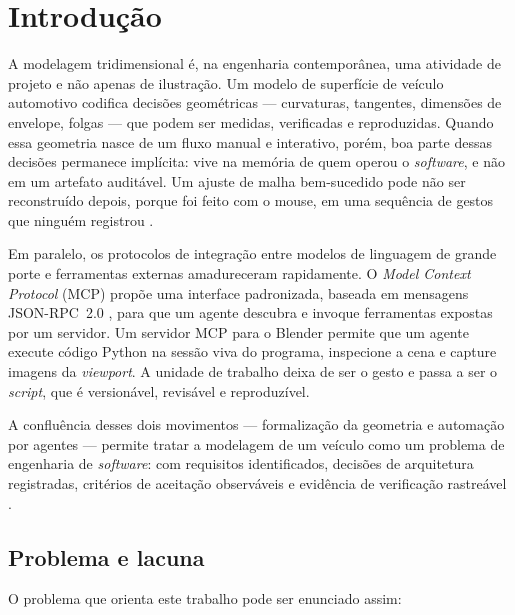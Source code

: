 \section{Introdu\c{c}\~ao}
\label{sec:introducao}

A modelagem tridimensional \'e, na engenharia contempor\^anea, uma atividade de projeto e n\~ao
apenas de ilustra\c{c}\~ao. Um modelo de superf\'icie de ve\'iculo automotivo codifica decis\~oes
geom\'etricas --- curvaturas, tangentes, dimens\~oes de envelope, folgas --- que podem ser
medidas, verificadas e reproduzidas. Quando essa geometria nasce de um fluxo manual e
interativo, por\'em, boa parte dessas decis\~oes permanece impl\'icita: vive na mem\'oria de
quem operou o \emph{software}, e n\~ao em um artefato audit\'avel. Um ajuste de malha
bem-sucedido pode n\~ao ser reconstru\'ido depois, porque foi feito com o mouse, em uma
sequ\^encia de gestos que ningu\'em registrou \cite{bbotsch2010}.

Em paralelo, os protocolos de integra\c{c}\~ao entre modelos de linguagem de grande porte e
ferramentas externas amadureceram rapidamente. O \emph{Model Context Protocol} (MCP)
\cite{mcpspec2024} prop\~oe uma interface padronizada, baseada em mensagens JSON-RPC~2.0
\cite{jsonrpc2020}, para que um agente descubra e invoque ferramentas expostas por um
servidor. Um servidor MCP para o Blender \cite{blendermcp2025} permite que um agente execute
c\'odigo Python na sess\~ao viva do programa, inspecione a cena e capture imagens da
\emph{viewport}. A unidade de trabalho deixa de ser o gesto e passa a ser o
\emph{script}, que \'e version\'avel, revis\'avel e reproduz\'ivel.

A conflu\^encia desses dois movimentos --- formaliza\c{c}\~ao da geometria e automa\c{c}\~ao por
agentes --- permite tratar a modelagem de um ve\'iculo como um problema de engenharia de
\emph{software}: com requisitos identificados, decis\~oes de arquitetura registradas,
crit\'erios de aceita\c{c}\~ao observ\'aveis e evid\^encia de verifica\c{c}\~ao rastre\'avel
\cite{shah1995, piegl1997, pahl2007}.

\subsection{Problema e lacuna}

O problema que orienta este trabalho pode ser enunciado assim:

